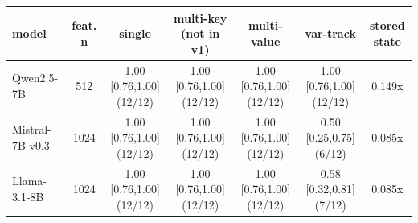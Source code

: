 \begin{tabular}{lcccccc}
\toprule
model & feat. n & single & multi-key (not in v1) & multi-value & var-track & stored state \\
\midrule
Qwen2.5-7B & 512 & 1.00 [0.76,1.00] (12/12) & 1.00 [0.76,1.00] (12/12) & 1.00 [0.76,1.00] (12/12) & 1.00 [0.76,1.00] (12/12) & 0.149x \\
Mistral-7B-v0.3 & 1024 & 1.00 [0.76,1.00] (12/12) & 1.00 [0.76,1.00] (12/12) & 1.00 [0.76,1.00] (12/12) & 0.50 [0.25,0.75] (6/12) & 0.085x \\
Llama-3.1-8B & 1024 & 1.00 [0.76,1.00] (12/12) & 1.00 [0.76,1.00] (12/12) & 1.00 [0.76,1.00] (12/12) & 0.58 [0.32,0.81] (7/12) & 0.085x \\
\bottomrule
\end{tabular}
